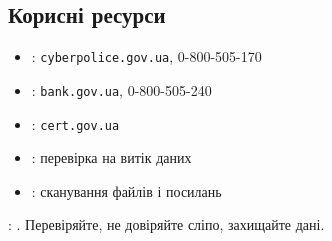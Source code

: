 \subsection*{Корисні ресурси}

\begin{itemize}[label=--]
\item {}: \texttt{cyberpolice.gov.ua}, 0-800-505-170
\item {}: \texttt{bank.gov.ua}, 0-800-505-240
\item {}: \texttt{cert.gov.ua}
\end{itemize}

\begin{itemize}[label=--]
\item {}: перевірка на витік даних
\item {}: сканування файлів і посилань
\end{itemize}

\vspace{1em}

\noindent{}: . Перевіряйте, не довіряйте сліпо, захищайте дані.

